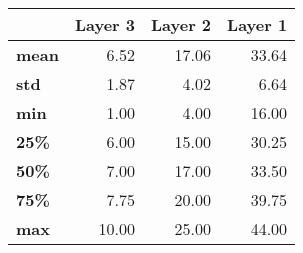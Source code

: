 \begin{tabular}{lrrr}
\toprule
{} &  Layer 3 &  Layer 2 &  Layer 1 \\
\midrule
\textbf{mean} &     6.52 &    17.06 &    33.64 \\
\textbf{std } &     1.87 &     4.02 &     6.64 \\
\textbf{min } &     1.00 &     4.00 &    16.00 \\
\textbf{25\% } &     6.00 &    15.00 &    30.25 \\
\textbf{50\% } &     7.00 &    17.00 &    33.50 \\
\textbf{75\% } &     7.75 &    20.00 &    39.75 \\
\textbf{max } &    10.00 &    25.00 &    44.00 \\
\bottomrule
\end{tabular}
